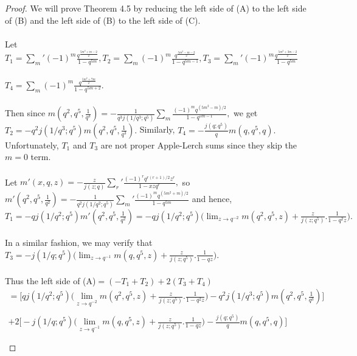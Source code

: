 \documentclass[10pt,reqno]{amsart}
\begin{document}
\begin{proof}
We will prove Theorem 4.5 by reducing the left side of (A) to the left side of (B) and the left side of (B) to the left side of (C). \\ \\
Let $T_1=\displaystyle\sum_{m}' (-1)^m\displaystyle\frac{q^{\frac{5m^2+m-2}{2}}}{1-q^{5m}},T_2=\displaystyle\sum_{m}(-1)^m\displaystyle\frac{q^{\frac{5m^2-m-2}{2}}}{1-q^{5m-1}},T_3=\displaystyle\sum_{m}'(-1)^m\displaystyle\frac{q^{\frac{5m^2+3m-2}{2}}}{1-q^{5m}}$\\ \\
$T_4=\displaystyle\sum_{m}(-1)^m\displaystyle\frac{q^{\frac{5m^2+7m}{2}}}{1-q^{5m+2}}.$ \\ \\
Then since $m(q^2,q^5,\displaystyle\frac{1}{q^3})=-\displaystyle\frac{1}{q^3j(1/q^3;q^5)}\displaystyle\sum_{m}\displaystyle\frac{(-1)^mq^{(5m^2-m)/2}}{1-q^{5m-1}},$ we get $T_2=-q^2j(1/q^3;q^5)m(q^2,q^5,\displaystyle\frac{1}{q^3}).$ Similarly, $T_4=-\displaystyle\frac{j(q;q^5)}{q}m(q,q^5,q).$
Unfortunately, $T_1$ and $T_3$ are not proper Apple-Lerch sums since they skip the $m=0$ term. \\ \\
Let $m'(x,q,z)=-\displaystyle\frac{z}{j(z;q)}\displaystyle\sum_{r}'\displaystyle\frac{(-1)^rq^{r(r+1)/2}z^r}{1-xzq^r},$ so $m'(q^2,q^5,\displaystyle\frac{1}{q^2})=-\displaystyle\frac{1}{q^2j(1/q^2;q^5)}\displaystyle\sum_{m}'\displaystyle\frac{(-1)^mq^{(5m^2+m)/2}}{1-q^{5m}}$ and hence, $T_1=-qj(1/q^2;q^5)m'(q^2,q^5,\displaystyle\frac{1}{q^2})=-qj(1/q^2;q^5)\Bigg(\lim_{z\to q^{-2}}m(q^2,q^5,z)+\displaystyle\frac{z}{j(z;q^5)}.\displaystyle\frac{1}{1-q^2z}\Bigg).$ \\ \\
In a similar fashion, we may verify that $T_3=-j(1/q;q^5)\Bigg(\lim_{z\to q^{-1}}m(q,q^5,z)+\displaystyle\frac{z}{j(z;q^5)}.\displaystyle\frac{1}{1-qz}\Bigg).$ \\ \\
Thus the left side of (A)$=(-T_1+T_2)+2(T_3+T_4)$
 \begin{align*}
     =\Bigg[qj(1/q^2;q^5)\Bigg(\lim_{z\to q^{-2}}m(q^2,q^5,z)+\displaystyle\frac{z}{j(z;q^5)}.\displaystyle\frac{1}{1-q^2z}\Bigg)-q^2j(1/q^3;q^5)m(q^2,q^5,\displaystyle\frac{1}{q^3})\Bigg] \\ \\
     +2\Bigg[-j(1/q;q^5)\Bigg(\lim_{z\to q^{-1}}m(q,q^5,z)+\displaystyle\frac{z}{j(z;q^5)}.\displaystyle\frac{1}{1-qz}\Bigg)-\displaystyle\frac{j(q;q^5)}{q}m(q,q^5,q)\Bigg] \\ \\

\end{align*}
\end{proof}
\end{document}
